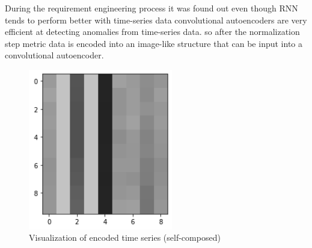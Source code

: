 During the requirement engineering process it was found out even though RNN tends to perform better with time-series data convolutional autoencoders are very efficient at detecting anomalies from time-series data. so after the normalization step metric data is encoded into an image-like structure that can be input into a convolutional autoencoder.

\begin{figure}[H]
    \includegraphics[height=7cm]{assets/implementation/visualize-representation.png}
    \caption{Visualization of encoded time series (self-composed)}
    \label{fig:visualize-representation}
\end{figure}